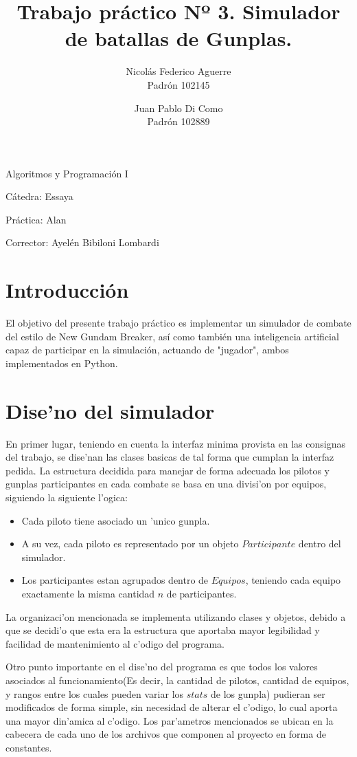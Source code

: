 \documentclass[12pt]{article}
\title{Trabajo pr\'actico Nº 3. Simulador de batallas de Gunplas.}
\author{Nicol\'as Federico Aguerre\\Padr\'on 102145
		\and
		Juan Pablo Di Como\\Padr\'on 102889}
\begin{document}

	\maketitle

	Algoritmos y Programaci\'on I

	C\'atedra: Essaya 


	Pr\'actica: Alan

	Corrector: Ayel\'en Bibiloni Lombardi

	\section{Introducci\'on}
		El objetivo del presente trabajo pr\'actico es implementar un simulador de combate del estilo de New Gundam Breaker, as\'i como 
		tambi\'en una inteligencia artificial capaz de participar en la simulaci\'on, actuando de "jugador", ambos implementados en Python.

	\section{Dise'no del simulador}
		En primer lugar, teniendo en cuenta la interfaz minima provista en las consignas del trabajo, se dise'nan las clases basicas de tal forma que cumplan la interfaz pedida.
		La estructura decidida para manejar de forma adecuada los pilotos y gunplas participantes en cada combate se basa en una divisi'on por equipos, siguiendo la siguiente l'ogica:

		\begin{itemize}
			\item Cada piloto tiene asociado un 'unico gunpla. 
			\item A su vez, cada piloto es representado por un objeto $Participante$ dentro del simulador.
			\item Los participantes estan agrupados dentro de $Equipos$, teniendo cada equipo exactamente la misma 
			cantidad $n$ de participantes.
		\end{itemize}

		La organizaci'on mencionada se implementa utilizando clases y objetos, debido a que se decidi'o que esta era la estructura 
		que aportaba mayor legibilidad y facilidad de mantenimiento al c'odigo del programa.\\
		\par
		Otro punto importante en el dise'no del programa es que todos los valores asociados al funcionamiento(Es decir, la cantidad de pilotos, cantidad de equipos, y rangos entre los cuales pueden variar los $stats$ de los gunpla) pudieran ser modificados
		de forma simple, sin necesidad de alterar el c'odigo, lo cual aporta una mayor din'amica al c'odigo. Los par'ametros mencionados 
		se ubican en la cabecera de cada uno de los archivos que componen al proyecto en forma de constantes.\\
		\par
\end{document}
